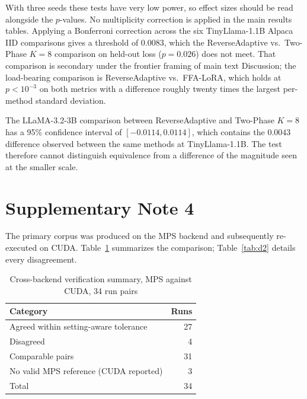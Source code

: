\documentclass[pdflatex,sn-nature]{sn-jnl}
\begin{document}
With three seeds these tests have very low power, so effect sizes should be read alongside the $p$-values. No multiplicity correction is applied in the main results tables. Applying a Bonferroni correction across the six TinyLlama-1.1B Alpaca IID comparisons gives a threshold of $0.0083$, which the ReverseAdaptive vs.\ Two-Phase $K{=}8$ comparison on held-out loss ($p = 0.026$) does not meet. That comparison is secondary under the frontier framing of main text Discussion; the load-bearing comparison is ReverseAdaptive vs.\ FFA-LoRA, which holds at $p < 10^{-3}$ on both metrics with a difference roughly twenty times the largest per-method standard deviation.

The LLaMA-3.2-3B comparison between ReverseAdaptive and Two-Phase $K{=}8$ has a 95\% confidence interval of $[{-}0.0114, 0.0114]$, which contains the $0.0043$ difference observed between the same methods at TinyLlama-1.1B. The test therefore cannot distinguish equivalence from a difference of the magnitude seen at the smaller scale.

\section*{Supplementary Note 4}
\label{app:crossbackend}

The primary corpus was produced on the MPS backend and subsequently re-executed on CUDA. Table~\ref{tab:d1} summarizes the comparison; Table~\ref{tab:d2} details every disagreement.

\begin{table}[tbp]
\centering
\footnotesize
\renewcommand{\arraystretch}{0.88}
\setlength{\tabcolsep}{6pt}
\caption{Cross-backend verification summary, MPS against CUDA, 34 run pairs}
\label{tab:d1}
\begin{tabular}{@{}lr@{}}
\toprule
Category & Runs \\
\midrule
Agreed within setting-aware tolerance & 27 \\
Disagreed & 4 \\
\midrule
Comparable pairs & 31 \\
No valid MPS reference (CUDA reported) & 3 \\
\midrule
Total & 34 \\
\bottomrule
\end{tabular}
\end{table}
\end{document}
